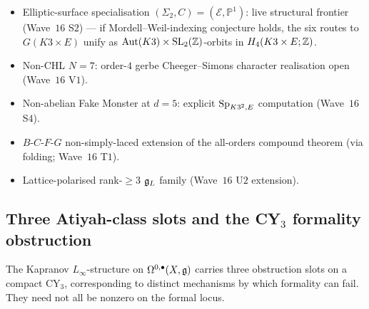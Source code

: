 \begin{itemize}
\item Elliptic-surface specialisation $(\Sigma_2, C) = (\mathcal{E},
\mathbb{P}^1)$: live structural frontier (Wave~$16$ S$2$) --- if
Mordell--Weil-indexing conjecture holds, the six routes to $G(K3\times E)$
unify as $\mathrm{Aut}(K3) \times \mathrm{SL}_2(\mathbb{Z})$-orbits in
$H_4(K3 \times E; \mathbb{Z})$.
\item Non-CHL $N=7$: order-$4$ gerbe Cheeger--Simons character realisation
open (Wave~$16$ V$1$).
\item Non-abelian Fake Monster at $d=5$: explicit $\mathrm{Sp}_{K3^2, E}$
computation (Wave~$16$ S$4$).
\item $B$-$C$-$F$-$G$ non-simply-laced extension of the all-orders
compound theorem (via folding; Wave~$16$ T$1$).
\item Lattice-polarised rank-$\geq 3$ $\mathfrak{g}_L$ family (Wave~$16$ U$2$
extension).
\end{itemize}

\subsection{Three Atiyah-class slots and the CY$_3$ formality obstruction}
\label{wn:subsec:plat-three-atiyah-cocycles}

The Kapranov $L_\infty$-structure on $\Omega^{0,\bullet}(X, \mathfrak{g})$ carries
three obstruction slots on a compact CY$_3$, corresponding to distinct
mechanisms by which formality can fail.  They need not all be nonzero on
the formal locus.

